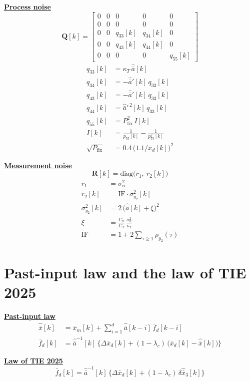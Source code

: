 \documentclass[11pt,a4paper]{ctexart}
\newcommand{\lc}{\lambda_c}
\newcommand{\bx}{\bar{x}}
\newcommand{\ba}{\bar{a}}
\newcommand{\Pfix}{P_{\mathrm{fix}}}
\newcommand{\IF}{\mathrm{IF}}
\newcommand{\hd}[1]{\par\bigskip\noindent\underline{\textbf{#1}}}
\begin{document}
\hd{Process noise}
\[
\mathbf{Q}[k] =
\begin{bmatrix}
0 & 0 & 0 & 0 & 0 \\
0 & 0 & 0 & 0 & 0 \\
0 & 0 & q_{33}[k] & q_{34}[k] & 0 \\
0 & 0 & q_{43}[k] & q_{44}[k] & 0 \\
0 & 0 & 0 & 0 & q_{55}[k]
\end{bmatrix}
\]
\[
\begin{aligned}
q_{33}[k] &= \kappa_T\,\hat{\ba}[k] \\
q_{34}[k] &= -\hat{\ba}'[k]\,q_{33}[k] \\
q_{43}[k] &= -\hat{\ba}'[k]\,q_{33}[k] \\
q_{44}[k] &= \hat{\ba}'^{\,2}[k]\,q_{33}[k] \\
q_{55}[k] &= \Pfix^{2}\,I[k] \\
I[k] &= \frac{1}{p_{55}[k]} - \frac{1}{p^f_{55}[k]} \\
\sqrt{\Pfix} &= 0.4\,\big(1.1/\bx_d[k]\big)^{2}
\end{aligned}
\]

\hd{Measurement noise}
\[
\mathbf{R}[k] = \mathrm{diag}\big(r_1,\ r_2[k]\big)
\]
\[
\begin{aligned}
r_1 &= \sigma^2_n \\
r_2[k] &= \IF\cdot\sigma^2_{y_2}[k] \\
\sigma^2_{y_2}[k] &= 2\,\big(\hat{\ba}[k] + \xi\big)^2 \\
\xi &= \frac{C_n}{C_T}\,\frac{\sigma^2_n}{\kappa_T} \\
\IF &= 1 + 2\sum_{\tau\ge1}\rho_{y_2}(\tau)
\end{aligned}
\]

\clearpage
\section{Past-input law and the law of TIE 2025}

\hd{Past-input law}
\[
\begin{aligned}
\hat{\bx}[k] &= \bx_m[k] + \sum_{i=1}^{d} \hat{\ba}[k-i]\,\bar f_d[k-i] \\
\bar f_d[k] &= \hat{\ba}^{-1}[k]\,\Big\{\Delta\bx_d[k] + (1-\lc)\,\big(\bx_d[k] - \hat{\bx}[k]\big)\Big\}
\end{aligned}
\]

\hd{Law of TIE 2025}
\[
\bar f_d[k] = \hat{\ba}^{-1}[k]\,\Big\{\Delta\bx_d[k] + (1-\lc)\,\delta\hat{\bx}_3[k]\Big\}
\]
\end{document}

